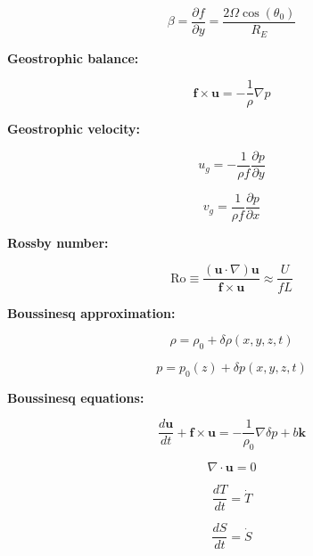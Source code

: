 \documentclass[12pt]{article}
\numberwithin{equation}{section}
\numberwithin{figure}{section}
\numberwithin{table}{section}
\begin{document}
\begin{equation}
  \beta = \frac{\partial f}{\partial y} = \frac{2\Omega\cos(\theta_0)}{R_E}
\end{equation}

\textbf{Geostrophic balance:}

\begin{equation}
  \mathbf{f} \times \mathbf{u} = - \frac{1}{\rho} \nabla p
\end{equation}

\textbf{Geostrophic velocity:}

\begin{equation}
  u_g = - \frac{1}{\rho f} \frac{\partial p}{\partial y}
\end{equation}

\begin{equation}
  v_g = \frac{1}{\rho f} \frac{\partial p}{\partial x}
\end{equation}

\textbf{Rossby number:}

\begin{equation}
  \text{Ro} \equiv \frac{\left( \mathbf{u} \cdot \nabla \right) \mathbf{u}}{\mathbf{f} \times \mathbf{u}} \approx \frac{U}{fL}
\end{equation}

\textbf{Boussinesq approximation:}

\begin{equation}
  \rho = \rho_0 + \delta \rho(x, y, z, t)
\end{equation}

\begin{equation}
  p = p_0(z) + \delta p(x, y, z, t)
\end{equation}

\textbf{Boussinesq equations:}

\begin{equation}
  \frac{d \mathbf{u}}{dt} + \mathbf{f} \times \mathbf{u} =
  - \frac{1}{\rho_0} \nabla \delta p + b \mathbf{k}
\end{equation}

\begin{equation}
  \nabla \cdot \mathbf{u} = 0
\end{equation}

\begin{equation}
  \frac{d T}{dt} = \dot{T}
\end{equation}

\begin{equation}
  \frac{d S}{dt} = \dot{S}
\end{equation}
\end{document}
